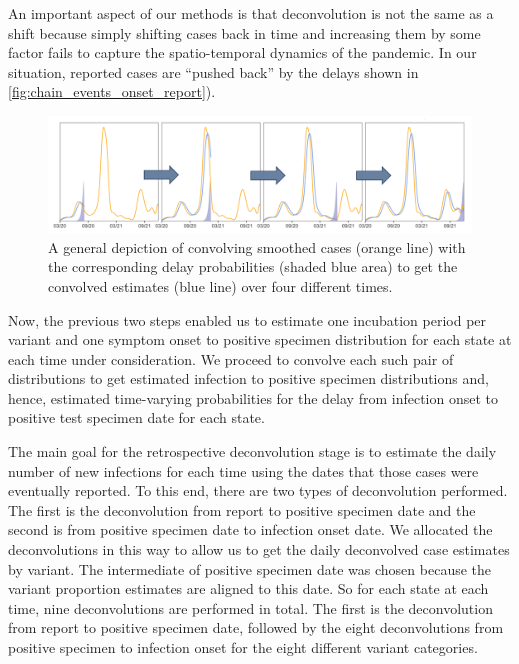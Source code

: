\documentclass{article}
\begin{document}
An important aspect of our methods is that deconvolution is not the same as a shift because simply shifting cases back in time and increasing them by some factor fails to capture the spatio-temporal dynamics of the pandemic. In our situation, reported cases are ``pushed back'' by the delays shown in \autoref{fig:chain_events_onset_report}).

\begin{figure}[!tb]
\centering
    \includegraphics[width=0.99\linewidth]{convolution_diagram.pdf}
    \caption{A general depiction of convolving smoothed cases (orange line) with the corresponding delay probabilities (shaded blue area) to get the convolved estimates (blue line) over four different times.}
    \label{fig:convol}
\end{figure}

Now, the previous two steps enabled us to estimate one incubation period per variant
and one symptom onset to positive specimen distribution for each state at each
time under consideration. We proceed to convolve each such pair of distributions
to get estimated infection to positive specimen distributions and, hence,
estimated time-varying probabilities for the delay from infection onset to
positive test specimen date for each state.

The main goal for the retrospective deconvolution stage is to estimate the daily
number of new infections for each time using the dates that those cases were
eventually reported. To this end, there are two types of deconvolution
performed. The first is the deconvolution from report to positive specimen date
and the second is from positive specimen date to infection onset date. We
allocated the deconvolutions in this way to allow us to get the daily
deconvolved case estimates by variant. The intermediate of positive specimen
date was chosen because the variant proportion estimates are aligned to this
date. So for each state at each time, nine deconvolutions are performed in
total. The first is the deconvolution from report to positive specimen date,
followed by the eight deconvolutions from positive specimen to infection onset
for the eight different variant categories.
\end{document}

